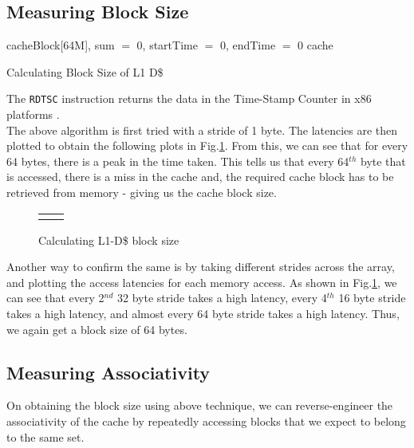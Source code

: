 \documentclass[12pt,a4paper,english]{paper}
\begin{document}
\subsection{Measuring Block Size}
\begin{algorithm}[H]
\SetAlgoLined
{}
 
  \init cacheBlock[64M], sum $=$ 0, startTime $=$ 0, endTime $=$ 0\; 
  \clear cache\;
 \caption{Calculating Block Size of L1 D\$}
\end{algorithm}

The \texttt{RDTSC} instruction returns the data in the Time-Stamp Counter in x86 platforms \cite{intel_2021}.\\

The above algorithm is first tried with a stride of 1 byte. The latencies are then plotted to obtain the following plots in Fig.\ref{Fig:blockSize}. From this, we can see that for every 64 bytes, there is a peak in the time taken. This tells us that every 64$^{th}$ byte that is accessed, there is a miss in the cache and, the required cache block has to be retrieved from memory - giving us the cache block size.
\begin{figure}[H]
    \centering
    \setlength\tabcolsep{1pt}
    \begin{tabular}{cc}
        \def\svgwidth{0.5\columnwidth}
        &
        \def\svgwidth{0.5\columnwidth}
        
    \end{tabular}
    \caption{Calculating L1-D\$ block size}
    \label{Fig:blockSize}
\end{figure}

Another way to confirm the same is by taking different strides across the array, and plotting the access latencies for each memory access. As shown in Fig.\ref{Fig:blockSize}, we can see that every 2$^{nd}$ 32 byte stride takes a high latency, every 4$^{th}$ 16 byte stride takes a high latency, and almost every 64 byte stride takes a high latency. Thus, we again get a block size of 64 bytes.

\subsection{Measuring Associativity}
On obtaining the block size using above technique, we can reverse-engineer the associativity of the cache by repeatedly accessing blocks that we expect to belong to the same set.



\newpage %



\end{document}
